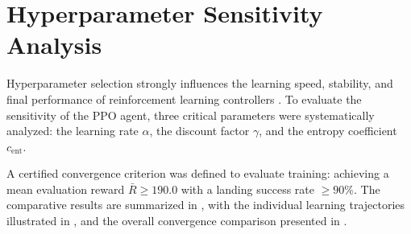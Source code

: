 
\section{Hyperparameter Sensitivity Analysis}
\label{sec:sensitivity_analysis}

Hyperparameter selection strongly influences the learning speed, stability, and final performance of reinforcement learning controllers \cite{vankampen2025lecture}. To evaluate the sensitivity of the PPO agent, three critical parameters were systematically analyzed: the learning rate $\alpha$, the discount factor $\gamma$, and the entropy coefficient $c_{\text{ent}}$.

A certified convergence criterion was defined to evaluate training: achieving a mean evaluation reward $\bar{R} \ge 190.0$ with a landing success rate $\ge 90\%$. The comparative results are summarized in , with the individual learning trajectories illustrated in , and the overall convergence comparison presented in .

